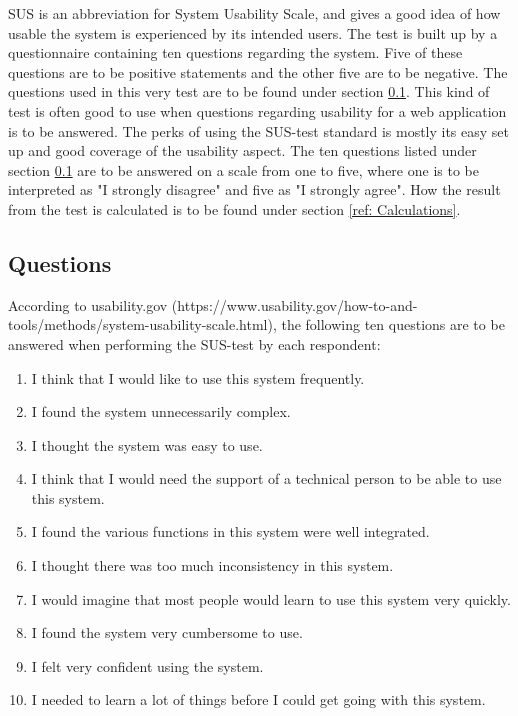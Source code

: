 \documentclass[12pt]{article}
\begin{document}
    SUS is an abbreviation for System Usability Scale, and gives a good idea of how usable the system is experienced by its intended users. The test is built up by a questionnaire containing ten questions regarding the system. Five of these questions are to be positive statements and the other five are to be negative. The questions used in this very test are to be found under section \ref{ref: Questions}. This kind of test is often good to use when questions regarding usability for a web application is to be answered. The perks of using the SUS-test standard is mostly its easy set up and good coverage of the usability aspect. The ten questions listed under section \ref{ref: Questions} are to be answered on a scale from one to five, where one is to be interpreted as "I strongly disagree" and five as "I strongly agree". How the result from the test is calculated is to be found under section \ref{ref: Calculations}. 
    
    \subsection{Questions}
    \label{ref: Questions}
    
    According to usability.gov (https://www.usability.gov/how-to-and-tools/methods/system-usability-scale.html), the following ten questions are to be answered when performing the SUS-test by each respondent: 
    
    \begin{enumerate}
        \item I think that I would like to use this system frequently.
        \item I found the system unnecessarily complex.
        \item I thought the system was easy to use.
        \item I think that I would need the support of a technical person to be able to use this system.
        \item I found the various functions in this system were well integrated.
        \item I thought there was too much inconsistency in this system.
        \item I would imagine that most people would learn to use this system very quickly.
        \item I found the system very cumbersome to use.
        \item I felt very confident using the system.
        \item I needed to learn a lot of things before I could get going with this system.
    \end{enumerate}
\end{document}
